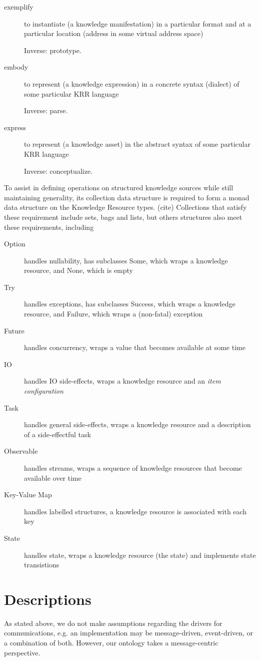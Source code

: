 \documentclass[runningheads]{llncs}
\begin{document}
\begin{description}
\item[exemplify] to instantiate (a knowledge manifestation) in a particular format and at a particular location (address in some virtual address space)

Inverse: prototype.
\item[embody] to represent (a knowledge expression) in a concrete syntax (dialect) of some particular KRR language

Inverse: parse.
\item[express] to represent (a knowledge asset) in the abstract syntax of some particular KRR language

Inverse: conceptualize.
\end{description}

To assist in defining operations on structured knowledge sources while still maintaining generality, its collection data structure is required to form a monad data structure on the Knowledge Resource types. (cite) Collections that satisfy these requirement include sets, bags and lists, but others structures also meet these requirements, including 
\begin{description}
\item [Option] handles nullability, has subclasses Some, which wraps a knowledge resource, and None, which is empty
\item [Try] handles exceptions, has subclasses Success, which wraps a knowledge resource, and Failure, which wraps a (non-fatal) exception
\item [Future] handles concurrency, wraps a value that becomes available at some time
\item [IO] handles IO side-effects, wraps a knowledge resource and an \emph{item configuration}
\item [Task] handles general side-effects, wraps a knowledge resource and a description of a side-effectful task
\item [Observable] handles streams, wraps a sequence of knowledge resources that become available over time
\item [Key-Value Map] handles labelled structures, a knowledge resource is associated with each key
\item [State] handles state, wraps a knowledge resource (the state) and implements state transistions
\end{description}


\section{Descriptions}
As stated above, we do not make assumptions regarding the drivers for communications, e.g. an implementation may be message-driven, event-driven, or a combination of both. However, our ontology takes a message-centric perspective. 
\end{document}
